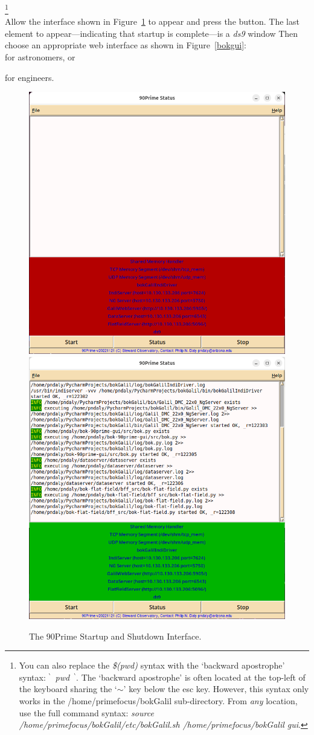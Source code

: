 \documentclass[12pt,twoside]{article}
\begin{document}
\footnote{
  You can also replace the \emph{\$(pwd)} syntax with the `backward apostrophe' syntax: 
  \emph{{\small $^\backprime$}~pwd~{\small $^\backprime$}}. The `backward apostrophe' is often 
  located at the top-left of the keyboard sharing the `$\sim$' key below the {\sc esc} key.
  However, this syntax only works in the /home/primefocus/bokGalil sub-directory. From \emph{any} location, 
  use the full command syntax: \emph{source \hspace{1mm} /home/primefocus/bokGalil/etc/bokGalil.sh \hspace{1mm} /home/primefocus/bokGalil \hspace{1mm} gui}.} \\

\noindent Allow the interface shown in Figure~\ref{boktcl} to appear and press the  button. The last element
to appear---indicating that startup is complete---is a \emph{ds9} window  Then choose an appropriate web interface as shown 
in Figure~\ref{bokgui}: \\

 for astronomers, or

 for engineers. \\

\begin{figure}[!h]
 \centering
 \includegraphics[width=0.4\linewidth]{bokSplashOff.png}
 \includegraphics[width=0.4\linewidth]{bokSplashOn.png}
 \caption{The 90Prime Startup and Shutdown Interface.}
 \label{boktcl}
\end{figure}
\end{document}
